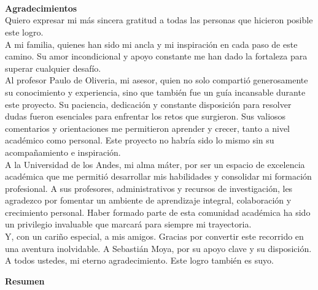 \newpage{\pagestyle{empty}\cleardoublepage}

\newpage
\thispagestyle{empty} \textbf{}\normalsize
\\\\\\%
\textbf{Agradecimientos}\\[4.0cm]



        Quiero expresar mi más sincera gratitud a todas las personas que hicieron posible este logro.\\

        A mi familia, quienes han sido mi ancla y mi inspiración en cada paso de este camino. Su amor incondicional y apoyo constante me han dado la fortaleza para superar cualquier desafío. \\
        
        Al profesor Paulo de Oliveria, mi asesor, quien no solo compartió generosamente su conocimiento y experiencia, sino que también fue un guía incansable durante este proyecto. Su paciencia, dedicación y constante disposición para resolver dudas fueron esenciales para enfrentar los retos que surgieron. Sus valiosos comentarios y orientaciones me permitieron aprender y crecer, tanto a nivel académico como personal. Este proyecto no habría sido lo mismo sin su acompañamiento e inspiración. \\

        A la Universidad de los Andes, mi alma máter, por ser un espacio de excelencia académica que me permitió desarrollar mis habilidades y consolidar mi formación profesional. A sus profesores, administrativos y recursos de investigación, les agradezco por fomentar un ambiente de aprendizaje integral, colaboración y crecimiento personal. Haber formado parte de esta comunidad académica ha sido un privilegio invaluable que marcará para siempre mi trayectoria. \\
        
        Y, con un cariño especial, a mis amigos. Gracias por convertir este recorrido en una aventura inolvidable. A Sebastián Moya,  por su apoyo clave y su disposición.\\
        
        A todos ustedes, mi eterno agradecimiento. Este logro también es suyo.
        



\newpage{\pagestyle{empty}\cleardoublepage}




\textbf{\LARGE Resumen}\\

